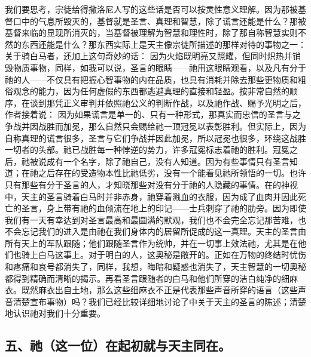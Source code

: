 我们要思考，宗徒给得撒洛尼人写的这些话是否可以按灵性意义理解。因为那被基督口中的气息所毁灭的，基督就是圣言、真理和智慧，除了谎言还能是什么？那被基督来临的显现所消灭的，当基督被理解为智慧和理性时，除了那自称智慧实则不然的东西还能是什么？那东西实际上是天主像宗徒所描述的那样对待的事物之一：  关于骑白马者，还加上这句奇妙的话： 因为火焰既明亮又照耀，但同时炽热并销毁物质事物，同样，如我可以说，圣言的眼睛——祂用这眼睛观看，以及凡有分于祂的人——不仅具有把握心智事物的内在品质，也具有消耗并除去那些更物质和粗俗观念的能力，因为任何虚假的东西都逃避真理的直接和轻盈。按非常自然的顺序，在谈到那凭正义审判并依照祂公义的判断作战，以及祂作战、赐予光明之后，作者接着说： 因为如果谎言是单一的、只有一种形式，那真实而忠信的圣言与之争战并因战胜而加冕，那么自然只会赐给祂一顶冠冕以表彰胜利。但实际上，因为自称真理的谎言很多，圣言与它们争战并因此加冕，所以冠冕也很多，环绕这战胜一切者的头部。祂已战胜每一种悖逆的势力，许多冠冕标志着祂的胜利。冠冕之后，祂被说成有一个名字，除了祂自己，没有人知道。因为有些事情只有圣言知道；在祂之后存在的受造物本性比祂低劣，没有一个能看见祂所领悟的一切。也许只有那些有分于圣言的人，才知晓那些对没有分于祂的人隐藏的事情。在的神视中，天主的圣言骑着白马时并非赤身，祂穿着溅血的衣服，因为成了血肉并因此死亡的圣言，身上带有祂的血倾流在地上的印记——士兵刺穿了祂的肋旁。因为即使我们有一天有幸达到对圣言最高和最圆满的默观，我们也不会完全忘记那苦难，也不会忘记我们的进入是由祂在我们身体内的居留所促成的这一真理。天主的圣言由所有天上的军队跟随；他们跟随圣言作为统帅，并在一切事上效法祂，尤其是在他们也骑上白马这事上。对于明白的人，这奥秘是敞开的。正如在万物的终结时忧伤和疼痛和哀号都消失了，同样，我想，晦暗和疑惑也消失了，天主智慧的一切奥秘都得到精确而清晰的揭示。再看圣言跟随者的白马和他们所穿的洁白纯净的细麻衣。既然麻衣出自土地，那么这些细麻衣不正是代表那些声音所穿的语言（这些声音清楚宣布事物）吗？我们已经比较详细地讨论了中关于天主的圣言的陈述；清楚地认识祂对我们十分重要。\par


\subsection{五、祂（这一位）在起初就与天主同在。}

